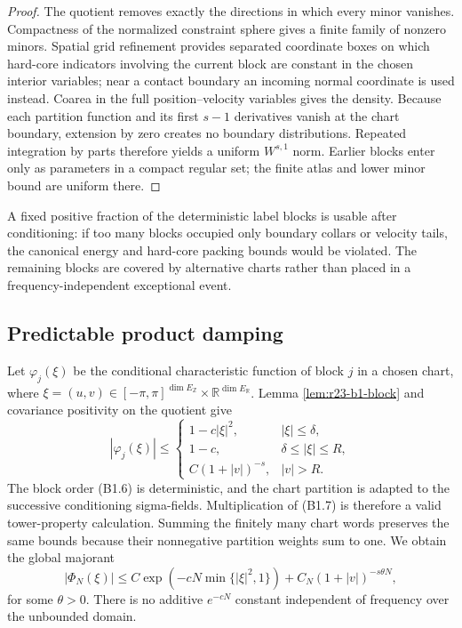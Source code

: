 \begin{proof}
The quotient removes exactly the directions in which every minor vanishes.
Compactness of the normalized constraint sphere gives a finite family of
nonzero minors.  Spatial grid refinement provides separated coordinate boxes
on which hard-core indicators involving the current block are constant in the
chosen interior variables; near a contact boundary an incoming normal
coordinate is used instead.  Coarea in the full position--velocity variables
gives the density.  Because each partition function and its first $s-1$
derivatives vanish at the chart boundary, extension by zero creates no
boundary distributions.  Repeated integration by parts therefore yields a
uniform $W^{s,1}$ norm.  Earlier blocks enter only as parameters in a compact
regular set; the finite atlas and lower minor bound are uniform there.
\end{proof}

A fixed positive fraction of the deterministic label blocks is usable after
conditioning: if too many blocks occupied only boundary collars or velocity
tails, the canonical energy and hard-core packing bounds would be violated.
The remaining blocks are covered by alternative charts rather than placed in
a frequency-independent exceptional event.

\subsection{Predictable product damping}

Let $\varphi_{j}(\xi)$ be the conditional characteristic function of block
$j$ in a chosen chart, where
$\xi=(u,v)\in[-\pi,\pi]^{\dim E_{\mathbb Z}}
\times\mathbb R^{\dim E_{\mathbb R}}$.  Lemma
\ref{lem:r23-b1-block} and covariance positivity on the quotient give
\[
 |\varphi_j(\xi)|\le
 \begin{cases}
 1-c|\xi|^2,&|\xi|\le\delta,\\
 1-c,&\delta\le|\xi|\le R,\\
 C(1+|v|)^{-s},&|v|>R.
 \end{cases}                                             \tag{B1.7}
\]
The block order (B1.6) is deterministic, and the chart partition is adapted to
the successive conditioning sigma-fields.  Multiplication of (B1.7) is
therefore a valid tower-property calculation.  Summing the finitely many chart
words preserves the same bounds because their nonnegative partition weights
sum to one.  We obtain the global majorant
\[
 |\Phi_N(\xi)|\le
 C\exp(-cN\min\{|\xi|^2,1\})
 +C_N(1+|v|)^{-s\theta N},                                \tag{B1.8}
\]
for some $\theta>0$.  There is no additive $e^{-cN}$ constant independent of
frequency over the unbounded domain.


